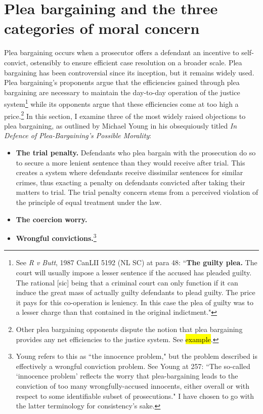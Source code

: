 \section{Plea bargaining and the three categories of moral concern}

Plea bargaining occurs when a prosecutor offers a defendant an incentive to self-convict, ostensibly to ensure efficient case resolution on a broader scale. Plea bargaining has been controversial since its inception, but it remains widely used. Plea bargaining's proponents argue that the efficiencies gained through plea bargaining are necessary to maintain the day-to-day operation of the justice system\footnote{See \textit{R v Butt}, 1987 CanLII 5192 (NL SC) at para 48: ``\textbf{The guilty plea.} The court will usually impose a lesser sentence if the accused has pleaded guilty. The rational [sic] being that a criminal court can only function if it can induce the great mass of actually guilty defendants to plead guilty. The price it pays for this co-operation is leniency. In this case the plea of guilty was to a lesser charge than that contained in the original indictment."} while its opponents argue that these efficiencies come at too high a price.\footnote{Other plea bargaining opponents dispute the notion that plea bargaining provides any net efficiencies to the justice system. See \hl{example}.} In this section, I examine three of the most widely raised objections to plea bargaining, as outlined by Michael Young in his obsequiously titled \textit{In Defence of Plea-Bargaining's Possible Morality}:

\begin{itemize}
    \item \textbf{The trial penalty.} Defendants who plea bargain with the prosecution do so to secure a more lenient sentence than they would receive after trial. This creates a system where defendants receive dissimilar sentences for similar crimes, thus exacting a penalty on defendants convicted after taking their matters to trial. The trial penalty concern stems from a perceived violation of the principle of equal treatment under the law.
    \item \textbf{The coercion worry.} 
    \item \textbf{Wrongful convictions.}\footnote{Young refers to this as ``the innocence problem," but the problem described is effectively a wrongful conviction problem. See Young at 257: ``The so-called `innocence problem' reflects the worry that plea-bargaining leads to the conviction of too many wrongfully-accused innocents, either overall or with respect to some identifiable subset of prosecutions."  I have chosen to go with the latter terminology for consistency's sake.} 
\end{itemize}

